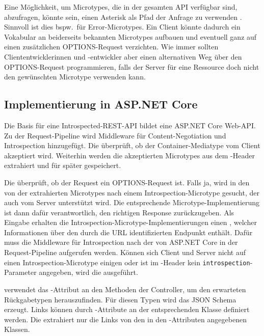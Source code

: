 \noindent{}Eine Möglichkeit, um Microtypes, die in der gesamten API verfügbar sind, abzufragen, könnte sein, einen Asterisk als Pfad der Anfrage zu verwenden \autocite[Abs.~4.3.7]{RFC7231}. Sinnvoll ist dies bspw.\ für Error-Microtypes. Ein Client könnte dadurch ein Vokabular an beiderseits bekannten Microtypes aufbauen und eventuell ganz auf einen zusätzlichen OPTIONS-Request verzichten. Wie immer sollten Cliententwicklerinnen und -entwickler aber einen alternativen Weg über den OPTIONS-Request programmieren, falls der Server für eine Ressource doch nicht den gewünschten Microtype verwenden kann.

\subsection{Implementierung in ASP.NET Core}
Die Basis für eine Introspected-REST-API bildet eine ASP.NET Core Web-API\@. Zu der Request-Pipeline wird Middleware für Content-Negotiation und Introspection hinzugefügt. Die  überprüft, ob der Container-Mediatype vom Client akzeptiert wird. Weiterhin werden die akzeptierten Microtypes aus dem -Header extrahiert und für später gespeichert.

Die  überprüft, ob der Request ein OPTIONS-Request ist. Falls ja, wird in den von der  extrahierten Microtypes nach einem Introspection-Microtype gesucht, der auch vom Server unterstützt wird. Die entsprechende Microtype-Implementierung ist dann dafür verantwortlich, den richtigen Response zurückzugeben. Als Eingabe erhalten die Introspection-Microtype-Implementierungen einen , welcher Informationen über den durch die URL identifizierten Endpunkt enthält. Dafür muss die Middleware für Introspection nach der  von ASP.NET Core in der Request-Pipeline aufgerufen werden. Können sich Client und Server nicht auf einen Introspection-Microtype einigen oder ist im -Header kein \texttt{introspection}-Parameter angegeben, wird die  ausgeführt.

 verwendet das -Attribut an den Methoden der Controller, um den erwarteten Rückgabetypen herauszufinden. Für diesen Typen wird das JSON Schema erzeugt. Links können durch -Attribute an der entsprechenden Klasse definiert werden. Die  extrahiert nur die Links von den in den -Attributen angegebenen Klassen.

